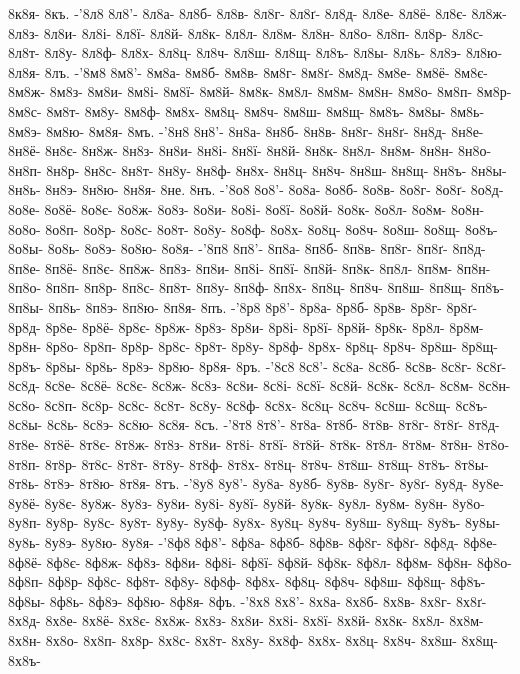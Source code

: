 8к8я-
8къ.
-'8л8
8л8'-
8л8а-
8л8б-
8л8в-
8л8г-
8л8ґ-
8л8д-
8л8е-
8л8ё-
8л8є-
8л8ж-
8л8з-
8л8и-
8л8і-
8л8ї-
8л8й-
8л8к-
8л8л-
8л8м-
8л8н-
8л8о-
8л8п-
8л8р-
8л8с-
8л8т-
8л8у-
8л8ф-
8л8х-
8л8ц-
8л8ч-
8л8ш-
8л8щ-
8л8ъ-
8л8ы-
8л8ь-
8л8э-
8л8ю-
8л8я-
8лъ.
-'8м8
8м8'-
8м8а-
8м8б-
8м8в-
8м8г-
8м8ґ-
8м8д-
8м8е-
8м8ё-
8м8є-
8м8ж-
8м8з-
8м8и-
8м8і-
8м8ї-
8м8й-
8м8к-
8м8л-
8м8м-
8м8н-
8м8о-
8м8п-
8м8р-
8м8с-
8м8т-
8м8у-
8м8ф-
8м8х-
8м8ц-
8м8ч-
8м8ш-
8м8щ-
8м8ъ-
8м8ы-
8м8ь-
8м8э-
8м8ю-
8м8я-
8мъ.
-'8н8
8н8'-
8н8а-
8н8б-
8н8в-
8н8г-
8н8ґ-
8н8д-
8н8е-
8н8ё-
8н8є-
8н8ж-
8н8з-
8н8и-
8н8і-
8н8ї-
8н8й-
8н8к-
8н8л-
8н8м-
8н8н-
8н8о-
8н8п-
8н8р-
8н8с-
8н8т-
8н8у-
8н8ф-
8н8х-
8н8ц-
8н8ч-
8н8ш-
8н8щ-
8н8ъ-
8н8ы-
8н8ь-
8н8э-
8н8ю-
8н8я-
8не.
8нъ.
-'8о8
8о8'-
8о8а-
8о8б-
8о8в-
8о8г-
8о8ґ-
8о8д-
8о8е-
8о8ё-
8о8є-
8о8ж-
8о8з-
8о8и-
8о8і-
8о8ї-
8о8й-
8о8к-
8о8л-
8о8м-
8о8н-
8о8о-
8о8п-
8о8р-
8о8с-
8о8т-
8о8у-
8о8ф-
8о8х-
8о8ц-
8о8ч-
8о8ш-
8о8щ-
8о8ъ-
8о8ы-
8о8ь-
8о8э-
8о8ю-
8о8я-
-'8п8
8п8'-
8п8а-
8п8б-
8п8в-
8п8г-
8п8ґ-
8п8д-
8п8е-
8п8ё-
8п8є-
8п8ж-
8п8з-
8п8и-
8п8і-
8п8ї-
8п8й-
8п8к-
8п8л-
8п8м-
8п8н-
8п8о-
8п8п-
8п8р-
8п8с-
8п8т-
8п8у-
8п8ф-
8п8х-
8п8ц-
8п8ч-
8п8ш-
8п8щ-
8п8ъ-
8п8ы-
8п8ь-
8п8э-
8п8ю-
8п8я-
8пъ.
-'8р8
8р8'-
8р8а-
8р8б-
8р8в-
8р8г-
8р8ґ-
8р8д-
8р8е-
8р8ё-
8р8є-
8р8ж-
8р8з-
8р8и-
8р8і-
8р8ї-
8р8й-
8р8к-
8р8л-
8р8м-
8р8н-
8р8о-
8р8п-
8р8р-
8р8с-
8р8т-
8р8у-
8р8ф-
8р8х-
8р8ц-
8р8ч-
8р8ш-
8р8щ-
8р8ъ-
8р8ы-
8р8ь-
8р8э-
8р8ю-
8р8я-
8ръ.
-'8с8
8с8'-
8с8а-
8с8б-
8с8в-
8с8г-
8с8ґ-
8с8д-
8с8е-
8с8ё-
8с8є-
8с8ж-
8с8з-
8с8и-
8с8і-
8с8ї-
8с8й-
8с8к-
8с8л-
8с8м-
8с8н-
8с8о-
8с8п-
8с8р-
8с8с-
8с8т-
8с8у-
8с8ф-
8с8х-
8с8ц-
8с8ч-
8с8ш-
8с8щ-
8с8ъ-
8с8ы-
8с8ь-
8с8э-
8с8ю-
8с8я-
8съ.
-'8т8
8т8'-
8т8а-
8т8б-
8т8в-
8т8г-
8т8ґ-
8т8д-
8т8е-
8т8ё-
8т8є-
8т8ж-
8т8з-
8т8и-
8т8і-
8т8ї-
8т8й-
8т8к-
8т8л-
8т8м-
8т8н-
8т8о-
8т8п-
8т8р-
8т8с-
8т8т-
8т8у-
8т8ф-
8т8х-
8т8ц-
8т8ч-
8т8ш-
8т8щ-
8т8ъ-
8т8ы-
8т8ь-
8т8э-
8т8ю-
8т8я-
8тъ.
-'8у8
8у8'-
8у8а-
8у8б-
8у8в-
8у8г-
8у8ґ-
8у8д-
8у8е-
8у8ё-
8у8є-
8у8ж-
8у8з-
8у8и-
8у8і-
8у8ї-
8у8й-
8у8к-
8у8л-
8у8м-
8у8н-
8у8о-
8у8п-
8у8р-
8у8с-
8у8т-
8у8у-
8у8ф-
8у8х-
8у8ц-
8у8ч-
8у8ш-
8у8щ-
8у8ъ-
8у8ы-
8у8ь-
8у8э-
8у8ю-
8у8я-
-'8ф8
8ф8'-
8ф8а-
8ф8б-
8ф8в-
8ф8г-
8ф8ґ-
8ф8д-
8ф8е-
8ф8ё-
8ф8є-
8ф8ж-
8ф8з-
8ф8и-
8ф8і-
8ф8ї-
8ф8й-
8ф8к-
8ф8л-
8ф8м-
8ф8н-
8ф8о-
8ф8п-
8ф8р-
8ф8с-
8ф8т-
8ф8у-
8ф8ф-
8ф8х-
8ф8ц-
8ф8ч-
8ф8ш-
8ф8щ-
8ф8ъ-
8ф8ы-
8ф8ь-
8ф8э-
8ф8ю-
8ф8я-
8фъ.
-'8х8
8х8'-
8х8а-
8х8б-
8х8в-
8х8г-
8х8ґ-
8х8д-
8х8е-
8х8ё-
8х8є-
8х8ж-
8х8з-
8х8и-
8х8і-
8х8ї-
8х8й-
8х8к-
8х8л-
8х8м-
8х8н-
8х8о-
8х8п-
8х8р-
8х8с-
8х8т-
8х8у-
8х8ф-
8х8х-
8х8ц-
8х8ч-
8х8ш-
8х8щ-
8х8ъ-
